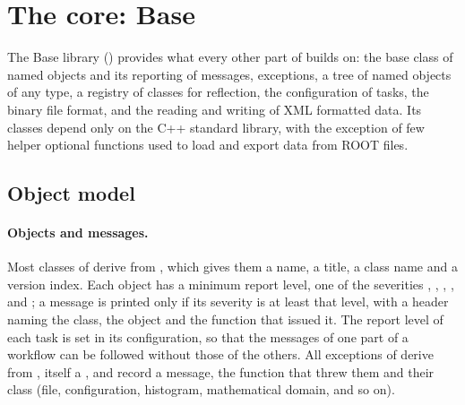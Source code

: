\section{The core: Base}
\label{sec:base}

The Base library () provides what every other part of \Datum{} builds on: the base class of named
objects and its reporting of messages, exceptions, a tree of named objects of any type, a registry of classes for
reflection, the configuration of tasks, the binary file format, and the reading and writing of XML formatted data. Its classes
depend only on the C++ standard library, with the exception of few helper optional  functions used  to load and export data from ROOT files.

\subsection{Object model}
\label{sec:objects}

\paragraph{Objects and messages.}
Most classes of \Datum{} derive from , which gives them a name, a title, a class name and a version
index. Each object has a minimum report level, one of the severities , , ,
,  and ; a message is printed only if its severity is at least that level, with
a header naming the class, the object and the function that issued it. The report level of each task is set in its
configuration, so that the messages of one part of a workflow can be followed without those of the others. All
exceptions of \Datum{} derive from , itself a , and record a message, the function
that threw them and their class (file, configuration, histogram, mathematical domain, and so on).


